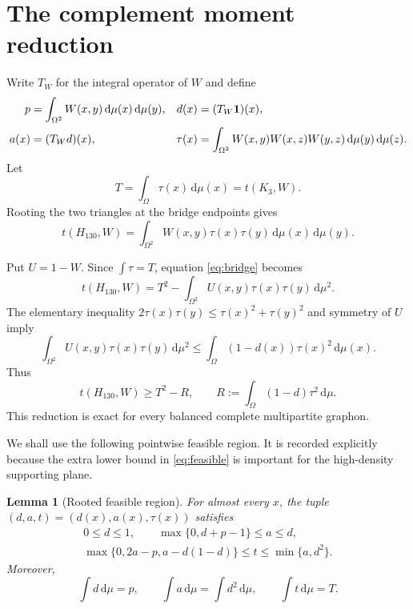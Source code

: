 \documentclass[11pt]{article}
\newtheorem{lemma}[theorem]{Lemma}
\newcommand{\dd}{\,\mathrm d}
\newcommand{\one}{\mathbf 1}
\begin{document}
\section{The complement moment reduction}

Write $T_W$ for the integral operator of $W$ and define
\begin{align}
 p&=\int_{\Omega^2}W(x,y)\dd\mu(x)\dd\mu(y),
 &d(x)&=(T_W\one)(x),\notag\\
 a(x)&=(T_Wd)(x),
 &\tau(x)&=\int_{\Omega^2}
 W(x,y)W(x,z)W(y,z)\dd\mu(y)\dd\mu(z).
 \label{eq:rooted}
\end{align}
Let
\[
 T=\int_\Omega\tau(x)\dd\mu(x)=t(K_3,W).
\]
Rooting the two triangles at the bridge endpoints gives
\begin{equation}
 t(H_{130},W)=\int_{\Omega^2}W(x,y)\tau(x)\tau(y)
 \dd\mu(x)\dd\mu(y).
 \label{eq:bridge}
\end{equation}

Put $U=1-W$.  Since $\int\tau=T$, equation \eqref{eq:bridge} becomes
\[
 t(H_{130},W)=T^2-\int_{\Omega^2}U(x,y)\tau(x)\tau(y)\dd\mu^2.
\]
The elementary inequality $2\tau(x)\tau(y)\leq\tau(x)^2+\tau(y)^2$
and symmetry of $U$ imply
\begin{equation}
 \int_{\Omega^2}U(x,y)\tau(x)\tau(y)\dd\mu^2
 \leq\int_\Omega(1-d(x))\tau(x)^2\dd\mu(x).
 \label{eq:moment-reduction}
\end{equation}
Thus
\begin{equation}
 t(H_{130},W)\geq T^2-R,
 \qquad
 R:=\int_\Omega(1-d)\tau^2\dd\mu.
 \label{eq:R}
\end{equation}
This reduction is exact for every balanced complete multipartite graphon.

We shall use the following pointwise feasible region.  It is recorded
explicitly because the extra lower bound in \eqref{eq:feasible} is important
for the high-density supporting plane.

\begin{lemma}[Rooted feasible region]\label{lem:feasible}
For almost every $x$, the tuple $(d,a,t)=(d(x),a(x),\tau(x))$ satisfies
\begin{equation}
\begin{gathered}
 0\leq d\leq1,
 \qquad \max\{0,d+p-1\}\leq a\leq d,\\
 \max\{0,2a-p,a-d(1-d)\}\leq t\leq\min\{a,d^2\}.
\end{gathered}
\label{eq:feasible}
\end{equation}
Moreover,
\begin{equation}
 \int d\dd\mu=p,
 \qquad \int a\dd\mu=\int d^2\dd\mu,
 \qquad \int t\dd\mu=T.
 \label{eq:means}
\end{equation}
\end{lemma}
\end{document}
